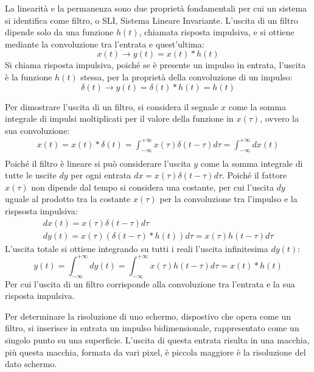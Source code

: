 \documentclass{article}
\numberwithin{equation}{subsection}
\begin{document}
La linearità e la permanenza sono due proprietà fondamentali per cui un sistema si identifica come filtro, o SLI, Sistema Lineare Invariante. L'uscita di un filtro dipende 
solo da una funzione $h(t)$, chiamata risposta impulsiva, e si ottiene mediante la convoluzione tra l'entrata e quest'ultima:
\begin{equation*}
    x(t)\to y(t)=x(t)*h(t)
\end{equation*}
Si chiama risposta impulsiva, poiché se è presente un impulso in entrata, l'uscita è la funzione $h(t)$ stessa, per la proprietà della convoluzione di un impulso:
\begin{equation*}
    \delta(t)\to y(t)=\delta(t)*h(t)=h(t)
\end{equation*}

Per dimostrare l'uscita di un filtro, si considera il segnale $x$ come la somma integrale di impulsi moltiplicati per il valore della funzione in $x(\tau)$, ovvero la sua 
convoluzione:
\begin{gather*}
    x(t)=x(t)*\delta(t)=\displaystyle\int_{-\infty}^{+\infty}x(\tau)\delta(t-\tau)d\tau=\int_{-\infty}^{+\infty}dx(t)\\
\end{gather*}
Poiché il filtro è lineare si può considerare l'uscita $y$ come la somma integrale di tutte le uscite $dy$ per ogni entrata $dx=x(\tau)\delta(t-\tau)d\tau$. Poiché il fattore 
$x(\tau)$ non dipende dal tempo si considera una costante, per cui l'uscita $dy$ uguale al prodotto tra la costante $x(\tau)$ per la convoluzione tra l'impulso e la 
rispsosta impulsiva:
\begin{gather*}
    dx(t)=x(\tau)\delta(t-\tau)d\tau\\
    dy(t)=x(\tau)(\delta(t-\tau)*h(t))d\tau=x(\tau)h(t-\tau)d\tau
\end{gather*}
L'uscita totale si ottiene integrando su tutti i reali l'uscita infinitesima $dy(t)$:
\begin{equation*}
    y(t)=\displaystyle\int_{-\infty}^{+\infty}dy(t)=\int_{-\infty}^{+\infty}x(\tau)h(t-\tau)d\tau=x(t)*h(t)
\end{equation*}
Per cui l'uscita di un filtro corrisponde alla convoluzione tra l'entrata e la sua risposta impulsiva. 

Per determinare la risoluzione di uno schermo, dispostivo che opera come un filtro, si inserisce in entrata un impulso bidimensionale, rappresentato come un singolo punto 
su una superficie. L'uscita di questa entrata risulta in una macchia, più questa macchia, formata da vari pixel, è piccola maggiore è la risoluzione del dato schermo.  
\end{document}
